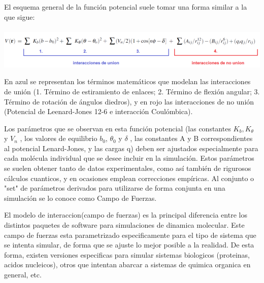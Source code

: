 \documentclass[a4paper,10pt]{report}
\begin{document}
El esquema general de la función potencial suele tomar una forma similar a la que sigue: \\ \\ 
\includegraphics[keepaspectratio, width=1.0\textwidth]{img/ecPotencialAmber.png}
\vspace{2pt}

En azul se representan los términos matemáticos que modelan las interacciones de unión (1. Término de estiramiento de enlaces; 2. Término de flexión angular; 3. Término de rotación de ángulos diedros), y en rojo
las interacciones de no unión (Potencial de Leenard-Jones 12-6 e interacción Coulómbica).

Los parámetros que se observan en esta función potencial (las constantes $K_b, K_{\theta}$ y $V_n$ , los valores de equilibrio $b_0$, $\theta_0$ y $\delta$ , 
las constantes A y B correspondientes al potencial Lenard-Jones, y las cargas q) deben ser ajustados especialmente para cada molécula individual que se desee incluir en la 
simulación. Estos parámetros se suelen obtener tanto de datos experimentales, como así también de rigurosos cálculos cuanticos, y en ocasiones emplean correcciones empíricas.
Al conjunto o "set" de parámetros derivados para utilizarse de forma conjunta en una simulación se lo conoce como Campo de Fuerzas.



El modelo de interaccion(campo de fuerzas) es la principal diferencia entre los distintos paquetes de software para simulaciones de dinamica molecular.
Este campo de fuerzas esta parametrizado especificamente para el tipo de sistema que se intenta simular, de forma que se ajuste lo mejor posible a la realidad. De esta forma, existen versiones especificas para simular sistemas biologicos (proteinas, acidos nucleicos), otros que intentan abarcar a sistemas de quimica organica en general, etc.
\end{document}
